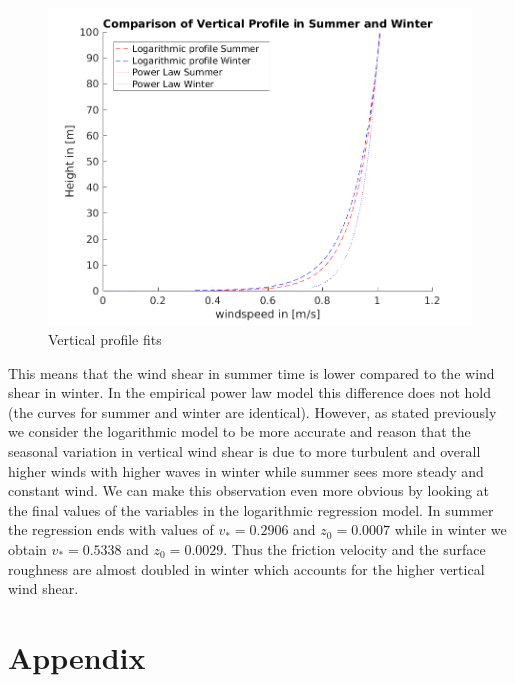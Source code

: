 \documentclass[10pt]{article}
\begin{document}
\begin{figure}[H]
\centering
\includegraphics[width=0.7\linewidth]{../figures/verticalProfilesComparison.png}
\caption{Vertical profile fits}
\label{fig:verticalProfComp}
\end{figure}

This means that the wind shear in summer time is lower compared to the wind shear in winter. In the empirical power law model this difference does not hold (the curves for summer and winter are identical). However, as stated previously we consider the logarithmic model to be more accurate and reason that the seasonal variation in vertical wind shear is due to more turbulent and overall higher winds with higher waves in winter while summer sees more steady and constant wind.
We can make this observation even more obvious by looking at the final values of the variables in the logarithmic regression model. In summer the regression ends with values of $v_{*}=0.2906$ and $z_0=0.0007$ while in winter we obtain $v_{*}=0.5338$ and $z_0=0.0029$. Thus the friction velocity and the surface roughness are almost doubled in winter which accounts for the higher vertical wind shear. \\

\newpage

\appendix
\section{Appendix}
\end{document}
